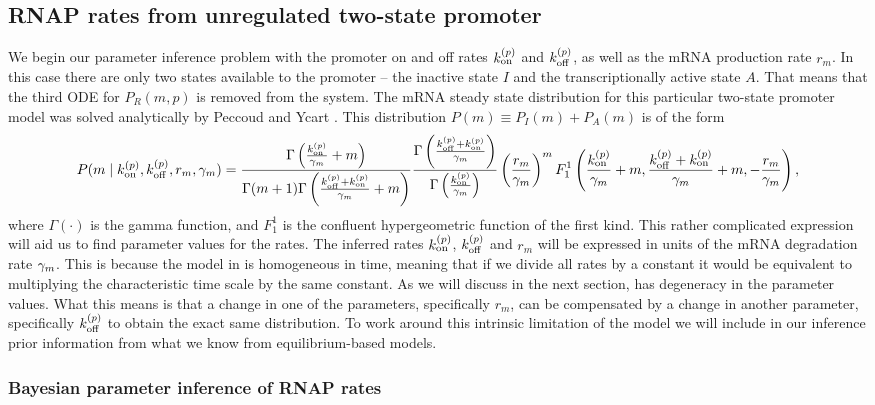 \subsection{RNAP rates from unregulated two-state promoter}

We begin our parameter inference problem with the promoter on and off rates
$k^{(p)}_{\text{on}}$ and $k^{(p)}_{\text{off}}$, as well as the mRNA production rate $r_m$. In this case
there are only two states available to the promoter -- the inactive state $I$
and the transcriptionally active  state $A$. That means that the third ODE for
$P_R(m, p)$ is removed from the system. The mRNA steady state distribution for
this particular two-state promoter model was solved analytically by Peccoud and
Ycart \cite{Peccoud1995}. This distribution $P(m) \equiv P_I(m) + P_A(m)$ is of
the form
\begin{equation}
  \small
  P(m \mid k^{(p)}_{\text{on}}, k^{(p)}_{\text{off}}, r_m, \gamma _m) =
  {\Gamma \left( \frac{k^{(p)}_{\text{on}}}{\gamma _m} + m \right) \over
  \Gamma(m + 1) \Gamma\left( \frac{k^{(p)}_{\text{off}}+k^{(p)}_{\text{on}}}{\gamma _m} + m \right)}
  {\Gamma\left( \frac{k^{(p)}_{\text{off}}+k^{(p)}_{\text{on}}}{\gamma _m} \right) \over
  \Gamma\left( \frac{k^{(p)}_{\text{on}}}{\gamma _m} \right)}
  \left( {r_m \over \gamma _m} \right)^m
  F_1^1 \left( {k^{(p)}_{\text{on}} \over \gamma _m} + m,
  {k^{(p)}_{\text{off}} + k^{(p)}_{\text{on}} \over \gamma _m} + m,
  -{r_m \over \gamma _m} \right),
  \label{seq_two_state_mRNA}
\end{equation}
where $\Gamma(\cdot)$ is the gamma function, and $F_1^1$ is the confluent
hypergeometric function of the first kind. This rather complicated expression
will aid us to find parameter values for the rates. The inferred rates $k^{(p)}_{\text{on}}$,
$k^{(p)}_{\text{off}}$ and $r_m$ will be expressed in units of the mRNA degradation rate
$\gamma _m$. This is because the model in  is homogeneous in
time, meaning that if we divide all rates by a constant it would be equivalent
to multiplying the characteristic time scale by the same constant. As we will
discuss in the next section,  has degeneracy in the
parameter values. What this means is that a change in one of the parameters,
specifically $r_m$, can be compensated by a change in another parameter,
specifically $k^{(p)}_{\text{off}}$ to obtain the exact same distribution. To work around this
intrinsic limitation of the model we will include in our inference prior
information from what we know from equilibrium-based models.

\subsubsection*{Bayesian parameter inference of RNAP rates}


